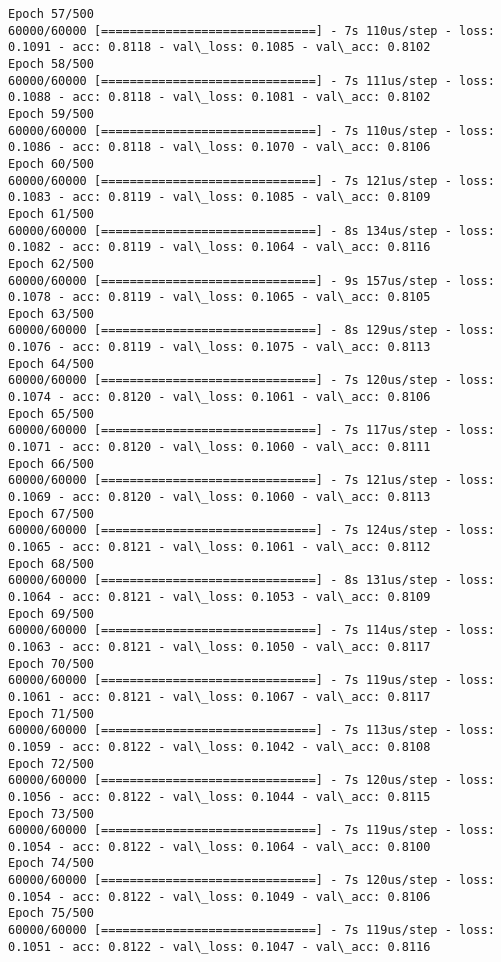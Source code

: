 \documentclass[11pt]{article}
\begin{document}
\begin{Verbatim}[commandchars=\\\{\}]
Epoch 57/500
60000/60000 [==============================] - 7s 110us/step - loss: 0.1091 - acc: 0.8118 - val\_loss: 0.1085 - val\_acc: 0.8102
Epoch 58/500
60000/60000 [==============================] - 7s 111us/step - loss: 0.1088 - acc: 0.8118 - val\_loss: 0.1081 - val\_acc: 0.8102
Epoch 59/500
60000/60000 [==============================] - 7s 110us/step - loss: 0.1086 - acc: 0.8118 - val\_loss: 0.1070 - val\_acc: 0.8106
Epoch 60/500
60000/60000 [==============================] - 7s 121us/step - loss: 0.1083 - acc: 0.8119 - val\_loss: 0.1085 - val\_acc: 0.8109
Epoch 61/500
60000/60000 [==============================] - 8s 134us/step - loss: 0.1082 - acc: 0.8119 - val\_loss: 0.1064 - val\_acc: 0.8116
Epoch 62/500
60000/60000 [==============================] - 9s 157us/step - loss: 0.1078 - acc: 0.8119 - val\_loss: 0.1065 - val\_acc: 0.8105
Epoch 63/500
60000/60000 [==============================] - 8s 129us/step - loss: 0.1076 - acc: 0.8119 - val\_loss: 0.1075 - val\_acc: 0.8113
Epoch 64/500
60000/60000 [==============================] - 7s 120us/step - loss: 0.1074 - acc: 0.8120 - val\_loss: 0.1061 - val\_acc: 0.8106
Epoch 65/500
60000/60000 [==============================] - 7s 117us/step - loss: 0.1071 - acc: 0.8120 - val\_loss: 0.1060 - val\_acc: 0.8111
Epoch 66/500
60000/60000 [==============================] - 7s 121us/step - loss: 0.1069 - acc: 0.8120 - val\_loss: 0.1060 - val\_acc: 0.8113
Epoch 67/500
60000/60000 [==============================] - 7s 124us/step - loss: 0.1065 - acc: 0.8121 - val\_loss: 0.1061 - val\_acc: 0.8112
Epoch 68/500
60000/60000 [==============================] - 8s 131us/step - loss: 0.1064 - acc: 0.8121 - val\_loss: 0.1053 - val\_acc: 0.8109
Epoch 69/500
60000/60000 [==============================] - 7s 114us/step - loss: 0.1063 - acc: 0.8121 - val\_loss: 0.1050 - val\_acc: 0.8117
Epoch 70/500
60000/60000 [==============================] - 7s 119us/step - loss: 0.1061 - acc: 0.8121 - val\_loss: 0.1067 - val\_acc: 0.8117
Epoch 71/500
60000/60000 [==============================] - 7s 113us/step - loss: 0.1059 - acc: 0.8122 - val\_loss: 0.1042 - val\_acc: 0.8108
Epoch 72/500
60000/60000 [==============================] - 7s 120us/step - loss: 0.1056 - acc: 0.8122 - val\_loss: 0.1044 - val\_acc: 0.8115
Epoch 73/500
60000/60000 [==============================] - 7s 119us/step - loss: 0.1054 - acc: 0.8122 - val\_loss: 0.1064 - val\_acc: 0.8100
Epoch 74/500
60000/60000 [==============================] - 7s 120us/step - loss: 0.1054 - acc: 0.8122 - val\_loss: 0.1049 - val\_acc: 0.8106
Epoch 75/500
60000/60000 [==============================] - 7s 119us/step - loss: 0.1051 - acc: 0.8122 - val\_loss: 0.1047 - val\_acc: 0.8116

\end{Verbatim}
\end{document}
